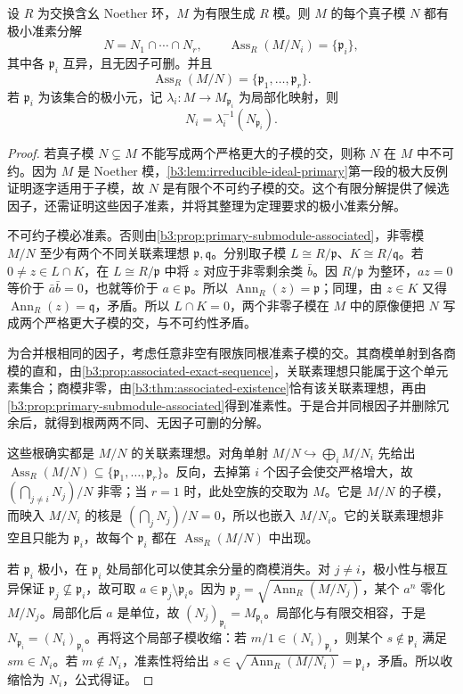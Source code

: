\begin{theorem}\label{b3:thm:module-primary-decomposition}
	设 \(R\) 为交换含幺 Noether 环，\(M\) 为有限生成 \(R\) 模。则 \(M\) 的每个真子模 \(N\) 都有极小准素分解
	\[
		N=N_1\cap\cdots\cap N_r, \qquad \operatorname{Ass}_R(M/N_i)=\{\mathfrak p_i\},
	\]
	其中各 \(\mathfrak p_i\) 互异，且无因子可删。并且
	\[
		\operatorname{Ass}_R(M/N)=\{\mathfrak p_1,\ldots,\mathfrak p_r\}.
	\]
	若 \(\mathfrak p_i\) 为该集合的极小元，记 \(\lambda_i:M\rightarrow M_{\mathfrak p_i}\) 为局部化映射，则
	\[
		N_i=\lambda_i^{-1}(N_{\mathfrak p_i}).
	\]
\end{theorem}
\begin{proof}
	若真子模 \(N\subsetneq M\) 不能写成两个严格更大的子模的交，则称 \(N\) 在 \(M\) 中不可约。因为 \(M\) 是 Noether 模，\cref{b3:lem:irreducible-ideal-primary}第一段的极大反例证明逐字适用于子模，故 \(N\) 是有限个不可约子模的交。这个有限分解提供了候选因子，还需证明这些因子准素，并将其整理为定理要求的极小准素分解。

	不可约子模必准素。否则由\cref{b3:prop:primary-submodule-associated}，非零模 \(M/N\) 至少有两个不同关联素理想 \(\mathfrak p,\mathfrak q\)。分别取子模 \(L\cong R/\mathfrak p\)、\(K\cong R/\mathfrak q\)。若 \(0\ne z\in L\cap K\)，在 \(L\cong R/\mathfrak p\) 中将 \(z\) 对应于非零剩余类 \(\bar b\)。因 \(R/\mathfrak p\) 为整环，\(az=0\) 等价于 \(\bar a\bar b=0\)，也就等价于 \(a\in\mathfrak p\)。所以 \(\operatorname{Ann}_R(z)=\mathfrak p\)；同理，由 \(z\in K\) 又得 \(\operatorname{Ann}_R(z)=\mathfrak q\)，矛盾。所以 \(L\cap K=0\)，两个非零子模在 \(M\) 中的原像便把 \(N\) 写成两个严格更大子模的交，与不可约性矛盾。

	为合并根相同的因子，考虑任意非空有限族同根准素子模的交。其商模单射到各商模的直和，由\cref{b3:prop:associated-exact-sequence}，关联素理想只能属于这个单元素集合；商模非零，由\cref{b3:thm:associated-existence}恰有该关联素理想，再由\cref{b3:prop:primary-submodule-associated}得到准素性。于是合并同根因子并删除冗余后，就得到根两两不同、无因子可删的分解。

	这些根确实都是 \(M/N\) 的关联素理想。对角单射 \(M/N\hookrightarrow\bigoplus_iM/N_i\) 先给出 \(\operatorname{Ass}_R(M/N)\subseteq\{\mathfrak p_1,\ldots,\mathfrak p_r\}\)。反向，去掉第 \(i\) 个因子会使交严格增大，故 \((\bigcap_{j\ne i}N_j)/N\) 非零；当 \(r=1\) 时，此处空族的交取为 \(M\)。它是 \(M/N\) 的子模，而映入 \(M/N_i\) 的核是 \((\bigcap_jN_j)/N=0\)，所以也嵌入 \(M/N_i\)。它的关联素理想非空且只能为 \(\mathfrak p_i\)，故每个 \(\mathfrak p_i\) 都在 \(\operatorname{Ass}_R(M/N)\) 中出现。

	若 \(\mathfrak p_i\) 极小，在 \(\mathfrak p_i\) 处局部化可以使其余分量的商模消失。对 \(j\ne i\)，极小性与根互异保证 \(\mathfrak p_j\not\subseteq\mathfrak p_i\)，故可取 \(a\in\mathfrak p_j\setminus\mathfrak p_i\)。因为 \(\mathfrak p_j=\sqrt{\operatorname{Ann}_R(M/N_j)}\)，某个 \(a^n\) 零化 \(M/N_j\)。局部化后 \(a\) 是单位，故 \((N_j)_{\mathfrak p_i}=M_{\mathfrak p_i}\)。局部化与有限交相容，于是 \(N_{\mathfrak p_i}=(N_i)_{\mathfrak p_i}\)。再将这个局部子模收缩：若 \(m/1\in(N_i)_{\mathfrak p_i}\)，则某个 \(s\notin\mathfrak p_i\) 满足 \(sm\in N_i\)。若 \(m\notin N_i\)，准素性将给出 \(s\in\sqrt{\operatorname{Ann}_R(M/N_i)}=\mathfrak p_i\)，矛盾。所以收缩恰为 \(N_i\)，公式得证。
\end{proof}

